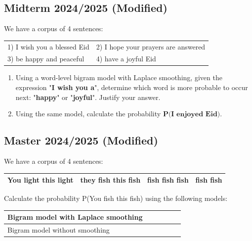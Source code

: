 \documentclass{../extra/aakpract/aakpract}
\begin{document}
	\subsection{Midterm 2024/2025 (Modified)}
	
	We have a corpus of 4 sentences:
	\begin{center}
		\begin{tabular}{|ll|}
			\hline
			1) I wish you a blessed Eid &
			2) I hope your prayers are answered \\
			3) be happy and peaceful &
			4) have a joyful Eid \\
			\hline
		\end{tabular}
	\end{center}
	
	\begin{enumerate}
		\item Using a word-level bigram model with Laplace smoothing, given the expression "\textbf{I wish you a}", determine which word is more probable to occur next: "\textbf{happy}" or "\textbf{joyful}". Justify your answer.
		\item Using the same model, calculate the probability \( \textbf{P(I enjoyed Eid)} \).
	\end{enumerate}
	
	\subsection{Master 2024/2025 (Modified)}
	
	We have a corpus of 4 sentences:
	\begin{center}
		\begin{tabular}{|l|l|l|l|}
			\hline
			You light this light &
			they fish this fish &
			fish fish fish &
			fish fish \\
			\hline
		\end{tabular}
	\end{center}
	
	Calculate the probability P(You fish this fish) using the following models:
	\begin{center}
		\begin{tabular}{|p{}|p{}|p{}|p{}|p{}|p{}|}
			\hline
			Bigram model with Laplace smoothing &&&&&\\
			\hline
			Bigram model without smoothing &&&&&\\
			\hline
		\end{tabular}
	\end{center}
	
\end{document}
